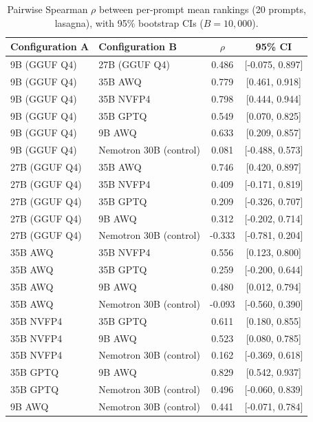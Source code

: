 \begin{table}[t]
\caption*{Pairwise Spearman $\rho$ between per-prompt mean rankings
  (20 prompts, lasagna), with 95\% bootstrap CIs ($B=10{,}000$).}
\small
\begin{tabular}{llcc}
\toprule
Configuration A & Configuration B & $\rho$ & 95\% CI \\
\midrule
9B (GGUF Q4) & 27B (GGUF Q4) & 0.486 & [-0.075, 0.897] \\
9B (GGUF Q4) & 35B AWQ & 0.779 & [0.461, 0.918] \\
9B (GGUF Q4) & 35B NVFP4 & 0.798 & [0.444, 0.944] \\
9B (GGUF Q4) & 35B GPTQ & 0.549 & [0.070, 0.825] \\
9B (GGUF Q4) & 9B AWQ & 0.633 & [0.209, 0.857] \\
9B (GGUF Q4) & Nemotron 30B (control) & 0.081 & [-0.488, 0.573] \\
27B (GGUF Q4) & 35B AWQ & 0.746 & [0.420, 0.897] \\
27B (GGUF Q4) & 35B NVFP4 & 0.409 & [-0.171, 0.819] \\
27B (GGUF Q4) & 35B GPTQ & 0.209 & [-0.326, 0.707] \\
27B (GGUF Q4) & 9B AWQ & 0.312 & [-0.202, 0.714] \\
27B (GGUF Q4) & Nemotron 30B (control) & -0.333 & [-0.781, 0.204] \\
35B AWQ & 35B NVFP4 & 0.556 & [0.123, 0.800] \\
35B AWQ & 35B GPTQ & 0.259 & [-0.200, 0.644] \\
35B AWQ & 9B AWQ & 0.480 & [0.012, 0.794] \\
35B AWQ & Nemotron 30B (control) & -0.093 & [-0.560, 0.390] \\
35B NVFP4 & 35B GPTQ & 0.611 & [0.180, 0.855] \\
35B NVFP4 & 9B AWQ & 0.523 & [0.080, 0.785] \\
35B NVFP4 & Nemotron 30B (control) & 0.162 & [-0.369, 0.618] \\
35B GPTQ & 9B AWQ & 0.829 & [0.542, 0.937] \\
35B GPTQ & Nemotron 30B (control) & 0.496 & [-0.060, 0.839] \\
9B AWQ & Nemotron 30B (control) & 0.441 & [-0.071, 0.784] \\
\bottomrule
\end{tabular}
\end{table}
